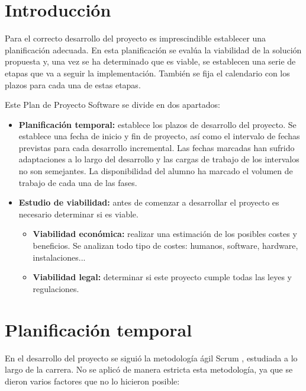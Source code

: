 
\section{Introducción}

Para el correcto desarrollo del proyecto es imprescindible establecer una planificación adecuada. En esta planificación se evalúa la viabilidad de la solución propuesta y, una vez se ha determinado que es viable, se establecen una serie de etapas que va a seguir la implementación. También se fija el calendario con los plazos para cada una de estas etapas.

Este Plan de Proyecto Software se divide en dos apartados:

\begin{itemize}
	\tightlist
	\item
	\textbf{Planificación temporal:} establece los plazos de desarrollo del proyecto. Se establece una fecha de inicio y fin de proyecto, así como el intervalo de fechas previstas para cada desarrollo incremental. Las fechas marcadas han sufrido adaptaciones a lo largo del desarrollo y las cargas de trabajo de los intervalos no son semejantes. La disponibilidad del alumno ha marcado el volumen de trabajo de cada una de las fases.
	\newline
	\item
	\textbf{Estudio de viabilidad:} antes de comenzar a desarrollar el proyecto es necesario determinar si es viable.
	\begin{itemize}
		\tightlist
		\item
		\textbf{Viabilidad económica:} realizar una estimación de los posibles costes y beneficios. Se analizan todo tipo de costes: humanos, software, hardware, instalaciones...
		\item
		\textbf{Viabilidad legal:} determinar si este proyecto cumple todas las leyes y regulaciones.
	\end{itemize}
\end{itemize} 



\newpage
\section{Planificación temporal}

En el desarrollo del proyecto se siguió la metodología ágil Scrum \cite{Scrum}, estudiada a lo largo de la carrera.
No se aplicó de manera estricta esta metodología, ya que se dieron varios factores que no lo hicieron posible:

